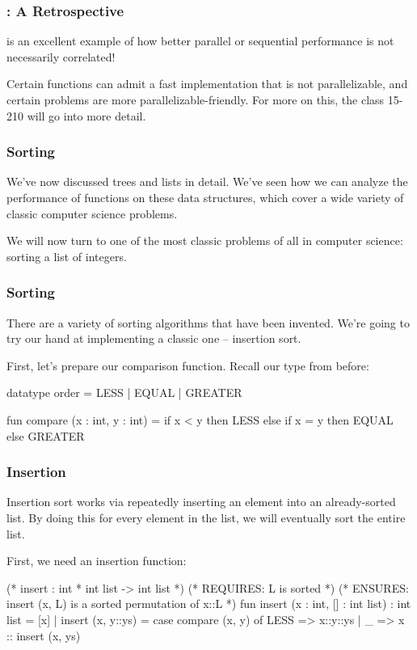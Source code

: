 \documentclass[aspectratio=169]{beamer}
\begin{document}
\begin{frame}[fragile]
  \frametitle{: A Retrospective}

   is an excellent example of how better parallel or sequential performance is not
  necessarily correlated!

  Certain functions can admit a fast implementation that is not parallelizable, and certain
  problems are more parallelizable-friendly. For more on this, the class 15-210 will go into
  more detail.
\end{frame}




\begin{frame}[fragile]
  \frametitle{Sorting}
  We've now discussed trees and lists in detail. We've seen how we can analyze the performance
  of functions on these data structures, which cover a wide variety of classic computer science
  problems.

  We will now turn to one of the most classic problems of all in computer science: sorting a
  list of integers.
\end{frame}

\begin{frame}[fragile]
  \frametitle{Sorting}

  There are a variety of sorting algorithms that have been invented. We're
  going to try our hand at implementing a classic one -- insertion sort.

  First, let's prepare our comparison function. Recall our  type from before:

  \begin{codeblock}
    datatype order = LESS | EQUAL | GREATER

    fun compare (x : int, y : int) =
      if x < y then
        LESS
      else if x = y then
        EQUAL
      else
        GREATER
  \end{codeblock}
\end{frame}

\begin{frame}[fragile]
  \frametitle{Insertion}

  Insertion sort works via repeatedly inserting an element into an already-sorted
  list. By doing this for every element in the list, we will eventually sort
  the entire list.

  First, we need an insertion function:
  \begin{codeblock}
    (* insert : int * int list -> int list *)
    (* REQUIRES: L is sorted *) 
    (* ENSURES: insert (x, L) is a sorted permutation of x::L *)
    fun insert (x : int, [] : int list) : int list = [x]
      | insert (x, y::ys) = 
          case compare (x, y) of 
            LESS => x::y::ys 
          | _ => x :: insert (x, ys)
  \end{codeblock}
\end{frame}
\end{document}
